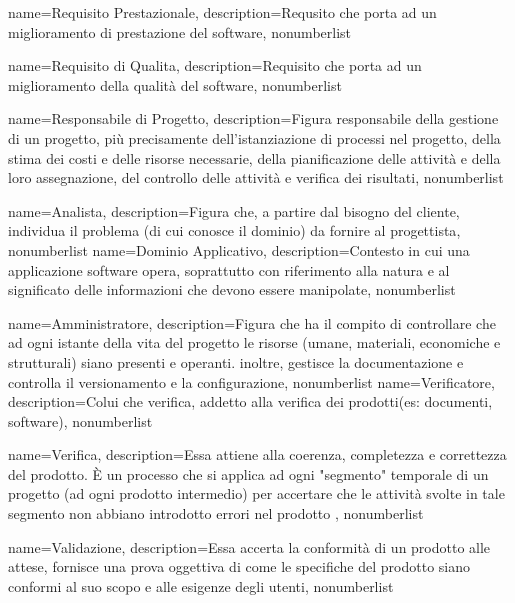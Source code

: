 {
	name={Requisito Prestazionale},
	description={Requsito che porta ad un miglioramento di prestazione del software},
	nonumberlist 
}

{
	name={Requisito di Qualita},
	description={Requisito che porta ad un miglioramento della qualità del software},
	nonumberlist 
}


{
	name={Responsabile di Progetto},
	description={Figura responsabile della gestione di un progetto, più precisamente dell'istanziazione di processi nel progetto, della stima dei costi e delle risorse necessarie, della pianificazione delle attività e della loro assegnazione, del controllo delle attività e verifica dei risultati},
	nonumberlist 
}

{
	name={Analista},
	description={Figura che, a partire dal bisogno del cliente, individua il problema (di cui conosce il dominio) da fornire al progettista},
	nonumberlist 
}
{
	name={Dominio Applicativo},
	description={Contesto in cui una applicazione software opera, soprattutto con riferimento alla natura e al significato delle informazioni che devono essere manipolate},
	nonumberlist 
}

{
	name={Amministratore},
	description={Figura che ha il compito di controllare che ad ogni istante della vita del progetto le risorse (umane, materiali, economiche e strutturali) siano presenti e operanti. inoltre, gestisce la documentazione e controlla il versionamento e la configurazione},
	nonumberlist 
}
{
	name={Verificatore},
	description={Colui che verifica, addetto alla verifica dei prodotti(es: documenti, software)},
	nonumberlist 
}

{
	name={Verifica},
	description={Essa attiene alla coerenza, completezza e correttezza del prodotto. È un processo che si applica ad ogni "segmento" temporale di un progetto (ad ogni prodotto intermedio) per accertare che le attività svolte in tale segmento non abbiano introdotto errori nel prodotto
	},
	nonumberlist 
}

{
	name={Validazione},
	description={Essa accerta la conformità di un prodotto alle attese, fornisce una prova oggettiva di come le specifiche del prodotto siano conformi al suo scopo e alle esigenze degli utenti},
	nonumberlist 
}

